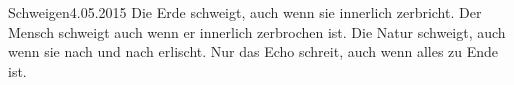 \begin{poem}[][ornarose]{Schweigen}{4.05.2015}
Die Erde schweigt, auch wenn sie innerlich zerbricht.
Der Mensch schweigt auch wenn er innerlich zerbrochen ist.
Die Natur schweigt, auch wenn sie nach und nach erlischt.
Nur das Echo schreit, auch wenn alles zu Ende ist.
\end{poem}